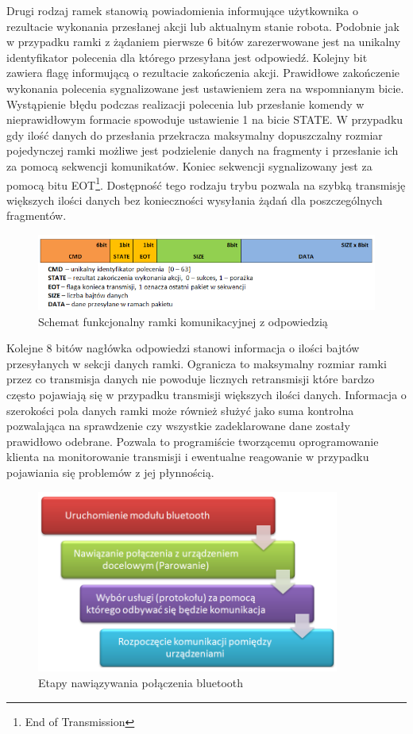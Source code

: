 Drugi rodzaj ramek stanowią powiadomienia informujące użytkownika o rezultacie 
wykonania przesłanej akcji lub aktualnym stanie robota. Podobnie jak w przypadku
ramki z żądaniem pierwsze 6 bitów zarezerwowane jest na unikalny identyfikator
polecenia dla którego przesyłana jest odpowiedź. Kolejny bit zawiera flagę
informującą o rezultacie zakończenia akcji. Prawidłowe zakończenie wykonania
polecenia sygnalizowane jest ustawieniem zera na wspomnianym bicie. Wystąpienie
błędu podczas realizacji polecenia lub przesłanie komendy w nieprawidłowym
formacie spowoduje ustawienie 1 na bicie STATE. W przypadku gdy ilość
danych do przesłania przekracza maksymalny dopuszczalny rozmiar
pojedynczej ramki możliwe jest podzielenie danych na fragmenty i przesłanie ich
za pomocą sekwencji komunikatów. Koniec sekwencji sygnalizowany jest za pomocą
bitu EOT\footnote{End of Transmission}. Dostępność tego rodzaju trybu pozwala
na szybką transmisję większych ilości danych bez konieczności wysyłania żądań dla poszczególnych fragmentów.

\begin{figure}[h!] 
 \centering
 \includegraphics[width=\textwidth]{../images/ch05/resp_schema2.png}
 \caption{Schemat funkcjonalny ramki komunikacyjnej z odpowiedzią}
 \label{fig:RfcommRespFrame}
\end{figure}

Kolejne 8 bitów nagłówka odpowiedzi stanowi informacja o ilości bajtów
przesyłanych w sekcji danych ramki. Ogranicza to maksymalny rozmiar ramki przez
co transmisja danych nie powoduje licznych retransmisji które bardzo często
pojawiają się w przypadku transmisji większych ilości danych. Informacja o
szerokości pola danych ramki może również służyć jako suma kontrolna pozwalająca
na sprawdzenie czy wszystkie zadeklarowane dane zostały prawidłowo odebrane.
Pozwala to programiście tworzącemu oprogramowanie klienta na monitorowanie
transmisji i ewentualne reagowanie w przypadku pojawiania się problemów z
jej płynnością.

\begin{figure}[h!]
 \centering
 \includegraphics[height=60mm]{../images/ch05/bt_conn_stages.png}
 \caption{Etapy nawiązywania połączenia bluetooth}
 \label{fig:BtConnStages}
\end{figure} 